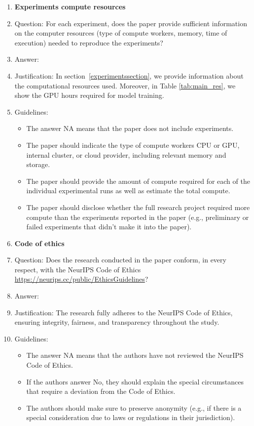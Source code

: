 \documentclass{article}
\begin{document}
\begin{enumerate}
\item {\bf Experiments compute resources}
    \item[] Question: For each experiment, does the paper provide sufficient information on the computer resources (type of compute workers, memory, time of execution) needed to reproduce the experiments?
    \item[] Answer: \answerYes{} %
    \item[] Justification: In section~\ref{experimentssection}, we provide information about the computational resources used. Moreover, in Table \ref{tab:main_res}, we show the GPU hours required for model training.
    \item[] Guidelines:
    \begin{itemize}
        \item The answer NA means that the paper does not include experiments.
        \item The paper should indicate the type of compute workers CPU or GPU, internal cluster, or cloud provider, including relevant memory and storage.
        \item The paper should provide the amount of compute required for each of the individual experimental runs as well as estimate the total compute. 
        \item The paper should disclose whether the full research project required more compute than the experiments reported in the paper (e.g., preliminary or failed experiments that didn't make it into the paper). 
    \end{itemize}
    
\item {\bf Code of ethics}
    \item[] Question: Does the research conducted in the paper conform, in every respect, with the NeurIPS Code of Ethics \url{https://neurips.cc/public/EthicsGuidelines}?
    \item[] Answer: \answerYes{} %
    \item[] Justification: The research fully adheres to the NeurIPS Code of Ethics, ensuring integrity, fairness, and transparency throughout the study.
    \item[] Guidelines:
    \begin{itemize}
        \item The answer NA means that the authors have not reviewed the NeurIPS Code of Ethics.
        \item If the authors answer No, they should explain the special circumstances that require a deviation from the Code of Ethics.
        \item The authors should make sure to preserve anonymity (e.g., if there is a special consideration due to laws or regulations in their jurisdiction).
    \end{itemize}



\end{enumerate}
\end{document}
